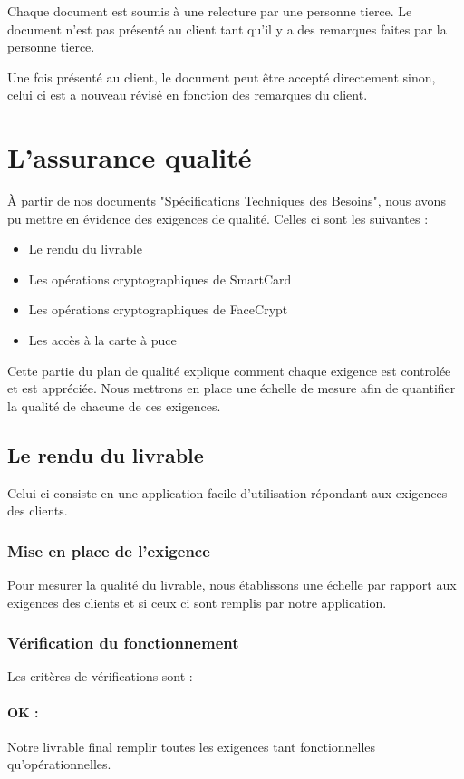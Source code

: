 \documentclass[a4paper,11pt,french]{article}
\begin{document}
	Chaque document est soumis à une relecture par une personne tierce.
Le document n'est pas présenté au client tant qu'il y a des remarques faites
par la personne tierce. 

	Une fois présenté au client, le document peut être accepté directement
sinon, celui ci est a nouveau révisé en fonction des remarques du client.


\section{L'assurance qualité}

	À partir de nos documents "Spécifications Techniques des Besoins", nous
avons pu mettre en évidence des exigences de qualité. Celles ci sont les
suivantes :
\begin{itemize}
	\item Le rendu du livrable
	\item Les opérations cryptographiques de SmartCard
	\item Les opérations cryptographiques de FaceCrypt
	\item Les accès à la carte à puce
\end{itemize}

	Cette partie du plan de qualité explique comment chaque exigence est
controlée et est appréciée. Nous mettrons en place une échelle de mesure afin
de quantifier la qualité de chacune de ces exigences.

\newpage
\subsection{Le rendu du livrable}
	Celui ci consiste en une application facile d'utilisation répondant
aux exigences des clients.
\subsubsection{Mise en place de l'exigence}
	Pour mesurer la qualité du livrable, nous établissons une échelle
par rapport aux exigences des clients et si ceux ci sont remplis par notre
application.
\subsubsection{Vérification du fonctionnement}
	Les critères de vérifications sont :
\paragraph{OK : } Notre livrable final remplir toutes les exigences tant
fonctionnelles qu'opérationnelles.
\end{document}
